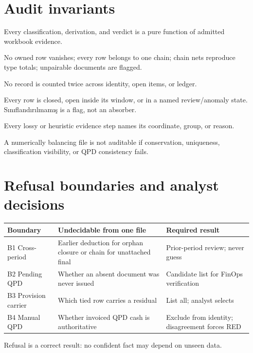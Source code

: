 \documentclass[11pt,a4paper]{article}
\theoremstyle{definition}
\begin{document}
\section{Audit invariants}
\begin{description}[leftmargin=1.5em,style=nextline]
\item[I1---Determinism.] Every classification, derivation, and verdict is
a pure function of admitted workbook evidence.
\item[I2---Conservation.] No owned row vanishes; every row belongs to one
chain; chain nets reproduce type totals; unpairable documents are flagged.
\item[I3---Row uniqueness.] No record is counted twice across identity,
open items, or ledger.
\item[I4---Explained or flagged.] Every row is closed, open inside its
window, or in a named review/anomaly state. Sınıflandırılmamış is a flag,
not an absorber.
\item[I5---Loud degradation.] Every lossy or heuristic evidence step
names its coordinate, group, or reason.
\end{description}
A numerically balancing file is not auditable if conservation,
uniqueness, classification visibility, or QPD consistency fails.

\section{Refusal boundaries and analyst decisions}
\begin{longtable}{@{}p{}p{}p{}@{}}
\toprule
\textbf{Boundary} & \textbf{Undecidable from one file} & \textbf{Required result}\\
\midrule
\endhead
B1 Cross-period & Earlier deduction for orphan closure or chain for unattached final & Prior-period review; never guess\\
B2 Pending QPD & Whether an absent document was never issued & Candidate list for FinOps verification\\
B3 Provision carrier & Which tied row carries a residual & List all; analyst selects\\
B4 Manual QPD & Whether invoiced QPD cash is authoritative & Exclude from identity; disagreement forces RED\\
\bottomrule
\end{longtable}
Refusal is a correct result: no confident fact may depend on unseen data.
\end{document}
